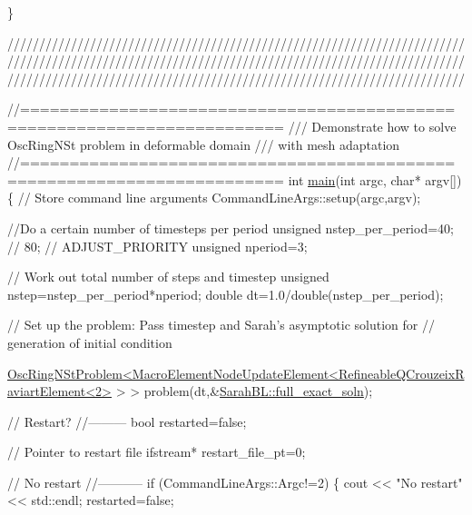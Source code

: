 \begin{DoxyCodeInclude}
{{{{{{{\}



\textcolor{comment}{}
\textcolor{comment}{////////////////////////////////////////////////////////////////////////}
\textcolor{comment}{////////////////////////////////////////////////////////////////////////}
\textcolor{comment}{////////////////////////////////////////////////////////////////////////}
\textcolor{comment}{}






\textcolor{comment}{//========================================================================}\textcolor{comment}{}
\textcolor{comment}{/// Demonstrate how to solve OscRingNSt problem in deformable domain}
\textcolor{comment}{/// with mesh adaptation}
\textcolor{comment}{}\textcolor{comment}{//========================================================================}
\textcolor{keywordtype}{int} \hyperlink{fsi__osc__ring_8cc_a0ddf1224851353fc92bfbff6f499fa97}{main}(\textcolor{keywordtype}{int} argc, \textcolor{keywordtype}{char}* argv[])
\{
 \textcolor{comment}{// Store command line arguments}
 CommandLineArgs::setup(argc,argv);

 \textcolor{comment}{//Do a certain number of timesteps per period}
 \textcolor{keywordtype}{unsigned} nstep\_per\_period=40; \textcolor{comment}{// 80;  // ADJUST\_PRIORITY}
 \textcolor{keywordtype}{unsigned} nperiod=3;

 \textcolor{comment}{// Work out total number of steps and timestep}
 \textcolor{keywordtype}{unsigned} nstep=nstep\_per\_period*nperiod;  
 \textcolor{keywordtype}{double} dt=1.0/double(nstep\_per\_period);

 \textcolor{comment}{// Set up the problem: Pass timestep and Sarah's asymptotic solution for}
 \textcolor{comment}{// generation of initial condition}
 
      \hyperlink{classOscRingNStProblem}{OscRingNStProblem<MacroElementNodeUpdateElement<RefineableQCrouzeixRaviartElement<2>}
       > >
  problem(dt,&\hyperlink{namespaceoomph_1_1SarahBL_a80c7c03073f6436ace00d2b2c5bfa501}{SarahBL::full\_exact\_soln});


 \textcolor{comment}{// Restart?}
 \textcolor{comment}{//---------}
 \textcolor{keywordtype}{bool} restarted=\textcolor{keyword}{false};

 \textcolor{comment}{// Pointer to restart file}
 ifstream* restart\_file\_pt=0;

 \textcolor{comment}{// No restart}
 \textcolor{comment}{//-----------}
 \textcolor{keywordflow}{if} (CommandLineArgs::Argc!=2)
  \{
   cout << \textcolor{stringliteral}{"No restart"} << std::endl;
   restarted=\textcolor{keyword}{false};

}}}}}}}
\end{DoxyCodeInclude}
